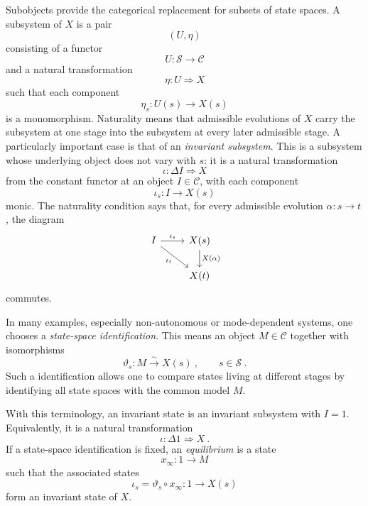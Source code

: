\documentclass[a4paper,reqno,oneside]{amsart}
\theoremstyle{definition}
\theoremstyle{remark}
\renewcommand{\theta}{\vartheta}
\numberwithin{equation}{section}
\begin{document}
Subobjects provide the categorical replacement for subsets of state spaces.
A subsystem of $X$ is a pair
\begin{equation}
    (U,\eta)
\end{equation}
consisting of a functor
\begin{equation}
    U\colon \mathcal S\to\mathcal C
\end{equation}
and a natural transformation
\begin{equation}
    \eta\colon U\Longrightarrow X
\end{equation}
such that each component
\begin{equation}
    \eta_s\colon U(s)\to X(s)
\end{equation}
is a monomorphism. Naturality means that admissible evolutions of $X$ carry
the subsystem at one stage into the subsystem at every later admissible
stage. A particularly important case is that of an \textit{invariant subsystem}. This is a subsystem whose underlying object does not vary with $s$: it is a natural transformation
\begin{equation}
    \iota\colon \Delta I\Longrightarrow X
\end{equation}
from the constant functor at an object $I\in\mathcal C$, with each component
\begin{equation}
    \iota_s\colon I\to X(s)
\end{equation}
monic. The naturality condition says that, for every admissible evolution
$\alpha\colon s\to t$, the diagram
\begin{equation}
\begin{tikzcd}
    I \arrow[r,"\iota_s"] \arrow[dr,"\iota_t"']
        & X(s) \arrow[d,"X(\alpha)"] \\
        & X(t)
\end{tikzcd}
\end{equation}
commutes.

In many examples, especially non-autonomous or mode-dependent systems, one chooses a \textit{state-space identification}. This means an object $M\in \mathcal C$ together with isomorphisms
\begin{equation}
    \theta_s\colon M\xrightarrow{\sim}X(s) \ ,
    \qquad s\in\mathcal S \ .
\end{equation}
Such a identification allows one to compare states living at different
stages by identifying all state spaces with the common model $M$.

With this terminology, an invariant state is an invariant subsystem with
$I=1$. Equivalently, it is a natural transformation
\begin{equation}
    \iota\colon \Delta 1\Longrightarrow X \ .
\end{equation}
If a state-space identification is fixed, an \textit{equilibrium} is a state
\begin{equation}
    x_\infty\colon 1\to M
\end{equation}
such that the associated states
\begin{equation}
    \iota_s=\theta_s\circ x_\infty\colon 1\to X(s)
\end{equation}
form an invariant state of $X$.
\end{document}
